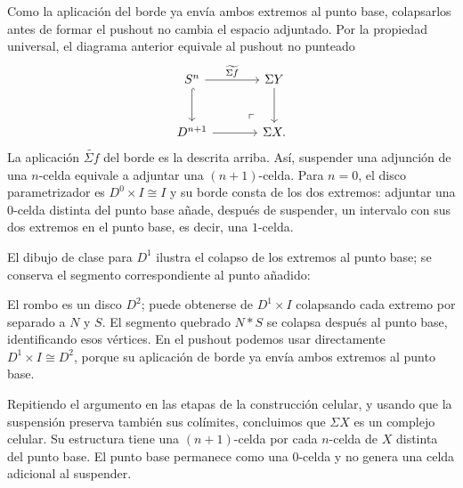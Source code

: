 Como la aplicación del borde ya envía ambos extremos al punto base, colapsarlos antes de formar el pushout no cambia el espacio adjuntado. Por la propiedad universal, el diagrama anterior equivale al pushout no punteado
\[
\begin{tikzcd}[column sep=large,row sep=large]
S^n
\arrow[r,"\widetilde{\Sigma f}"] \arrow[d,hook]
& \Sigma Y \arrow[d]\\
D^{n+1} \arrow[r]
& \Sigma X \arrow[ul,phantom,"\ulcorner",very near start].
\end{tikzcd}
\]
La aplicación $\widetilde{\Sigma f}$ del borde es la descrita arriba. Así, suspender una adjunción de una $n$-celda equivale a adjuntar una $(n+1)$-celda. Para $n=0$, el disco parametrizador es $D^0\times I\cong I$ y su borde consta de los dos extremos: adjuntar una $0$-celda distinta del punto base añade, después de suspender, un intervalo con sus dos extremos en el punto base, es decir, una $1$-celda.

El dibujo de clase para $D^1$ ilustra el colapso de los extremos al punto base; se conserva el segmento correspondiente al punto añadido:
\begin{center}
\end{center}
El rombo es un disco $D^2$; puede obtenerse de $D^1\times I$ colapsando cada extremo por separado a $N$ y $S$. El segmento quebrado $N* S$ se colapsa después al punto base, identificando esos vértices. En el pushout podemos usar directamente $D^1\times I\cong D^2$, porque su aplicación de borde ya envía ambos extremos al punto base.

Repitiendo el argumento en las etapas de la construcción celular, y usando que la suspensión preserva también sus colímites, concluimos que $\Sigma X$ es un complejo celular. Su estructura tiene una $(n+1)$-celda por cada $n$-celda de $X$ distinta del punto base. El punto base permanece como una $0$-celda y no genera una celda adicional al suspender.

